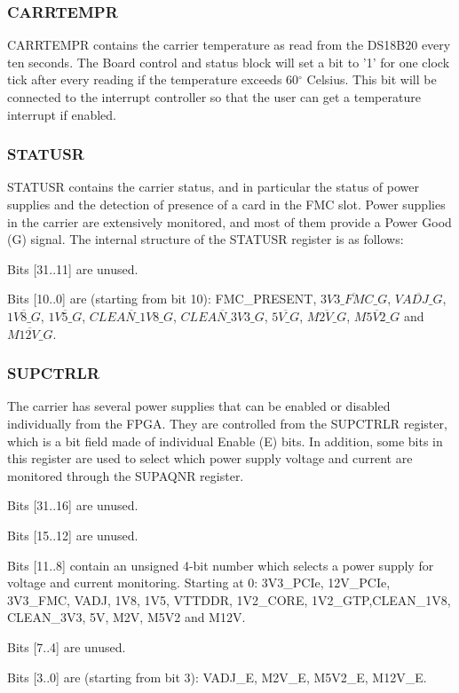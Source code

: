 \documentclass{article}
\newenvironment{packed_item}{
\begin{itemize}
  \setlength{\itemsep}{1pt}
  \setlength{\parskip}{0pt}
  \setlength{\parsep}{0pt}
}{\end{itemize}}
\begin{document}
\subsubsection{CARRTEMPR}
CARRTEMPR contains the carrier temperature as read from the DS18B20 every ten seconds. The Board control and status block will set a bit to '1' for one clock tick after every reading if the temperature exceeds 60$^\circ$ Celsius. This bit will be connected to the interrupt controller so that the user can get a temperature interrupt if enabled. 

\subsubsection{STATUSR}
STATUSR contains the carrier status, and in particular the status of power supplies and the detection of presence of a card in the FMC slot. Power supplies in the carrier are extensively monitored, and most of them provide a Power Good (G) signal. The internal structure of the STATUSR register is as follows:
\begin{packed_item}
\item Bits [31..11] are unused.
\item Bits [10..0] are (starting from bit 10): FMC\_PRESENT, $\overline{3V3\_FMC\_G}$,  $\overline{VADJ\_G}$, $\overline{1V8\_G}$,  $\overline{1V5\_G}$,  $\overline{CLEAN\_1V8\_G}$, $\overline{CLEAN\_3V3\_G}$, $\overline{5V\_G}$, \linebreak$\overline{M2V\_G}$, $\overline{M5V2\_G}$ and $\overline{M12V\_G}$.
\end{packed_item}

\subsubsection{SUPCTRLR}
The carrier has several power supplies that can be enabled or disabled individually from the FPGA. They are controlled from the SUPCTRLR register, which is a bit field made of individual Enable (E) bits. In addition, some bits in this register are used to select which power supply voltage and current are monitored through the SUPAQNR register.
\begin{packed_item}
\item Bits [31..16] are unused.
\item Bits [15..12] are unused.
\item Bits [11..8] contain an unsigned 4-bit number which selects a power supply for voltage and current monitoring. Starting at 0: 3V3\_PCIe, 12V\_PCIe, 3V3\_FMC, VADJ, 1V8, 1V5, VTTDDR, 1V2\_CORE, 1V2\_GTP,\linebreak CLEAN\_1V8, CLEAN\_3V3, 5V, M2V, M5V2 and M12V.
\item Bits [7..4] are unused.
\item Bits [3..0] are (starting from bit 3): VADJ\_E, M2V\_E, M5V2\_E, M12V\_E.
\end{packed_item}
\end{document}
